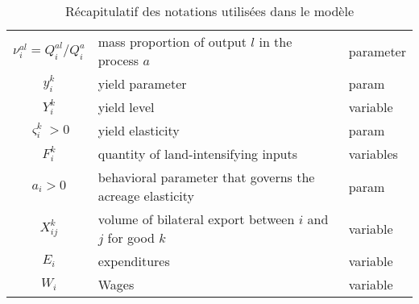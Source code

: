 \begin{table}[h!]
\begin{tabular}{c|l|l}
        $\nu_i^{al} = Q_i^{al} / Q_i^a$             & mass proportion of output $l$ in the process $a$                   & parameter                         \\

        $y_i^k$                                     & yield parameter                                                    & param                             \\

        $Y_i^k$                                     & yield level                                                        & variable                          \\

        $\varsigma_i^k > 0$                         & yield elasticity                                                   & param                             \\

        $F_i^k$                                     & quantity of land-intensifying inputs                               & variables                         \\

        $a_i > 0$                                   & behavioral parameter that governs the acreage elasticity           & param                             \\

        $X_{ij}^k$                                  & volume of bilateral export between $i$ and $j$ for good $k$        & variable                          \\

        $E_i$                                       & expenditures                                                       & variable                          \\

        $W_i$                                       & Wages                                                              & variable                          \\
    \end{tabular}
    \caption{Récapitulatif des notations utilisées dans le modèle}
    \label{table:variable}
\end{table}